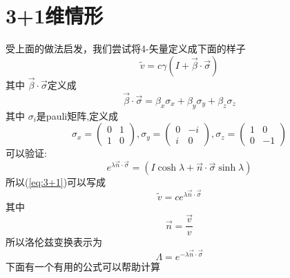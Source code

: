 \documentclass[hyperref,utf8]{ctexart}
\begin{document}
\section{3+1维情形}
受上面的做法启发，我们尝试将4-矢量定义成下面的样子
\begin{equation}
    \tilde{v}=c \gamma(I+\vec{\beta}\cdot\vec{\sigma}) \label{eq:3+1}
\end{equation} 
其中 $\vec{\beta}\cdot\vec{\sigma}$定义成
\[\vec{\beta}\cdot\vec{\sigma}=\beta_{x} \sigma_{x}+\beta_{y} \sigma_{y}+\beta_{z} \sigma_{z}\] 
其中 $\sigma_i$是pauli矩阵,定义成
\[\sigma_x=\begin{pmatrix}
    0&1\\1&0
\end{pmatrix},\sigma_y=\begin{pmatrix}
    0&-i\\i&0
\end{pmatrix},\sigma_z=\begin{pmatrix}
    1&0\\0&-1
\end{pmatrix}\]
可以验证:
\[e^{\lambda\vec{n}\cdot\vec{\sigma}}=(I\cosh \lambda+\vec{n}\cdot\vec{\sigma}\sinh \lambda)\]
所以(\ref{eq:3+1})可以写成
\begin{equation*}
    \tilde{v}=c e^{\lambda \vec{n}\cdot\vec{\sigma}}
\end{equation*}
其中
\[\vec{n}=\frac{\vec{v}}{v}\]
所以洛伦兹变换表示为
\[\Lambda=e^{-\lambda \vec{n}\cdot\vec{\sigma}}\]
下面有一个有用的公式可以帮助计算
\end{document}
